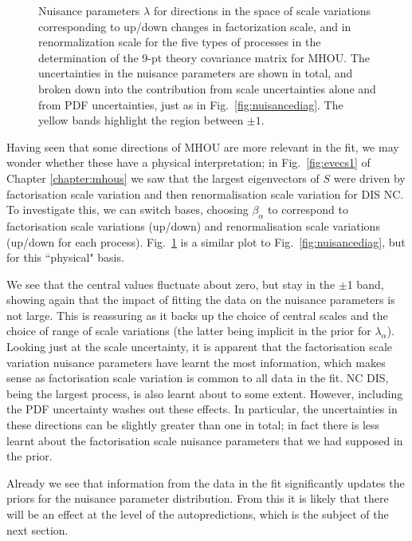 \begin{figure}[H]
\begin{center}
    \end{center}
  \vspace{-0.55cm}
  \caption{Nuisance parameters $\lambda$ for directions in the space of scale variations corresponding to up/down changes in factorization scale, and in renormalization scale for the five types of processes in the determination of the $9$-pt theory covariance matrix for MHOU. The uncertainties in the nuisance parameters are shown in total, and broken down into the contribution from scale uncertainties alone and from PDF uncertainties, just as in Fig.~\ref{fig:nuisancediag}. The yellow bands highlight the region between $\pm 1$.}
  \label{fig:nuisancephys}
\end{figure}

Having seen that some directions of MHOU are more relevant in the fit, we may wonder whether these have a physical interpretation; in Fig.~\ref{fig:evecs1} of Chapter \ref{chapter:mhous} we saw that the largest eigenvectors of $S$ were driven by factorisation scale variation and then renormalisation scale variation for DIS NC. To investigate this, we can switch bases, choosing $\beta_\alpha$ to correspond to factorisation scale variations (up/down) and renormalisation scale variations (up/down for each process). Fig.~\ref{fig:nuisancephys} is a similar plot to Fig.~\ref{fig:nuisancediag}, but for this ``physical" basis. 

We see that the central values fluctuate about zero, but stay in the $\pm$1 band, showing again that the impact of fitting the data on the nuisance parameters is not large. This is reassuring as it backs up the choice of central scales and the choice of range of scale variations (the latter being implicit in the prior for $\lambda_\alpha$). Looking just at the scale uncertainty, it is apparent that the factorisation scale variation nuisance parameters have learnt the most information, which makes sense as factorisation scale variation is common to all data in the fit. NC DIS, being the largest process, is also learnt about to some extent. However, including the PDF uncertainty washes out these effects. In particular, the uncertainties in these directions can be slightly greater than one in total; in fact there is less learnt about the factorisation scale nuisance parameters that we had supposed in the prior.

Already we see that information from the data in the fit significantly updates the priors for the nuisance parameter distribution. From this it is likely that there will be an effect at the level of the autopredictions, which is the subject of the next section.

